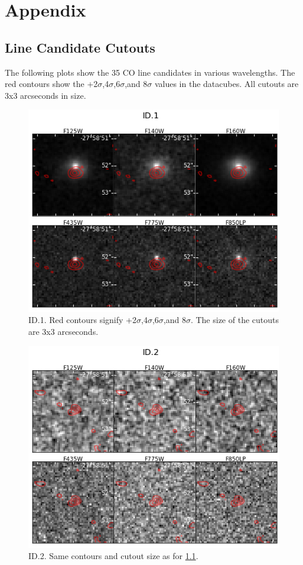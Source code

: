 \chapter{Appendix}

\section{Line Candidate Cutouts}\label{sec:A1}

The following plots show the 35 CO line candidates in various wavelengths. The red contours show the +2$\sigma$,4$\sigma$,6$\sigma$,and 8$\sigma$ values in the datacubes. All cutouts are 3x3 arcseconds in size.

\begin{figure}[tbp]
\centering \includegraphics[width=160mm]{Matched/ASPECS_Cutout_0.jpg}
\caption{ID.1. Red contours signify +2$\sigma$,4$\sigma$,6$\sigma$,and 8$\sigma$. The size of the cutouts are 3x3 arcseconds.}
\label{fig:Match_One}
\end{figure}

\begin{figure}[tbp]
\centering \includegraphics[width=160mm]{Matched/ASPECS_Cutout_1.jpg}
\caption{ID.2. Same contours and cutout size as for \ref{fig:Match_One}.}
\label{fig:Match_Two}
\end{figure}


